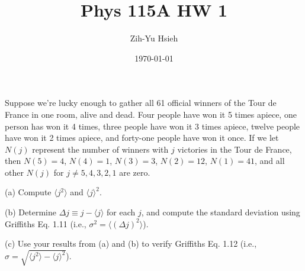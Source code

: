 \documentclass{article}
\title{Phys 115A HW 1}
\author{Zih-Yu Hsieh}
\date{\today}
\begin{document}
\maketitle

\begin{ques}\label{q1}
Suppose we’re lucky enough to gather all 61 official winners of the Tour de France in one
room, alive and dead. Four people have won it 5 times apiece, one person has won it 4
times, three people have won it 3 times apiece, twelve people have won it 2 times apiece, and
forty-one people have won it once. If we let $N(j)$ represent the number of winners with $j$
victories in the Tour de France, then $N(5) = 4$, $N(4) = 1$, $N(3) = 3$, $N(2) = 12$, $N(1) = 41$,
and all other $N(j)$ for $j \neq 5, 4, 3, 2, 1$ are zero.

(a) Compute $\langle j^2\rangle$ and $\langle j\rangle^2$.

(b) Determine $\Delta j \equiv j-\langle j\rangle$ for each $j$, and compute the standard deviation using Griffiths
Eq. 1.11 (i.e., $\sigma^2 = \langle (\Delta j)^2\rangle$).

(c) Use your results from (a) and (b) to verify Griffiths Eq. 1.12 (i.e., $\sigma =
\sqrt{\langle j^2\rangle - \langle j\rangle^2}$). %
\end{ques}
\end{document}
